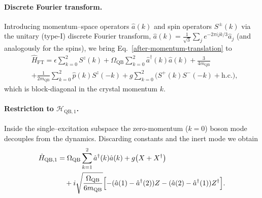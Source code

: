 \documentclass[reprint, aps, prx, amsmath, amssymb, longbibliography, superscriptaddress]{revtex4-2}
\begin{document}
\paragraph{Discrete Fourier transform.}
Introducing momentum--space operators $\hat a(k)$ and spin operators $S^{\pm}(k)$
via the unitary (type-I) discrete Fourier transform, $\hat a(k)= \tfrac{1}{\sqrt{3}}\sum_{j}e^{-2\pi i jk/3}\hat a_j$ (and analogously for the spins), we
bring Eq.~\eqref{after-momentum-translation} to
\begin{equation}
\label{after-fourier}
  \begin{aligned}
    &\hat H_{\text{FT}} = \epsilon \sum_{k=0}^{2} S^{z}(k)
      + \Omega_{\text{QB}} \sum_{k=0}^{2} \hat a^{\dagger}(k) \hat a(k)
                         + \frac{3}{4 m_{\text{QB}}} \\
     &+\frac{1}{2 m_{\text{QB}}} \sum_{k=0}^{2} \hat p(k) S^{z}(-k)
            + g \sum_{k=0}^{2} \bigl( S^{+}(k) S^{-}(-k) + \text{h.c.} \bigr),
  \end{aligned}
\end{equation}
which is block-diagonal in the crystal momentum $k$.

\paragraph{Restriction to $\mathcal H_{\text{QB},1}$.}
Inside the single--excitation subspace the zero-momentum ($k=0$) boson mode
decouples from the dynamics.  Discarding constants and the inert mode we obtain
\begin{equation}
  \begin{aligned}
    \hat H_{\text{QB},1} &= \Omega_{\text{QB}} \sum_{k=1}^{2} \hat a^{\dagger}(k)
      \hat a(k) + g \bigl( X + X^{\dagger} \bigr)
      \\
      &\quad + i \sqrt{ \frac{\Omega_{\text{QB}}}{6 m_{\text{QB}}} }
        \Bigl[ -( \hat a(1) - \hat a^{\dagger}(2) ) Z
        - ( \hat a(2) - \hat a^{\dagger}(1) ) Z^{\dagger} \Bigr].
  \end{aligned}
\end{equation}
\end{document}
